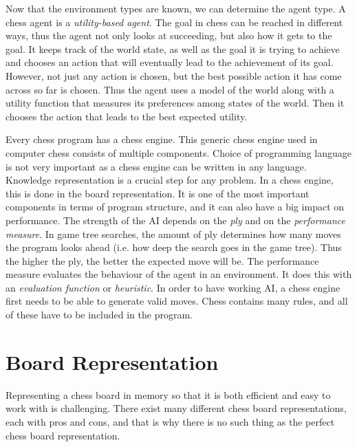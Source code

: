 \documentclass[11pt,letterpaper,twocolumn]{article}
\begin{document}
Now that the environment types are known, we can determine the agent type. A chess agent is a \emph{utility-based agent}. The goal in chess can be reached in different ways,
thus the agent not only looks at succeeding, but also how it gets to the goal. It keeps track of the world state, as well as the goal it is trying to achieve and chooses
an action that will eventually lead to the achievement of its goal. However, not just any action is chosen, but the best possible action it has come across so far is chosen.
Thus the agent uses a model of the world along with a utility function that measures its preferences among states of the world. Then it chooses the action that leads to
the best expected utility.

Every chess program has a chess engine. This generic chess engine used in computer chess consists of multiple components. Choice of programming language is not very important as a chess engine can be written in
any language. Knowledge representation is a crucial step for any problem. In a chess engine, this is done in the board representation. It is one of the most important components in terms of program structure,
and it can also have a big impact on performance. The strength of the AI depends on the \emph{ply} and on the \emph{performance measure}. In game tree searches,
the amount of ply determines how many moves the program looks ahead (i.e. how deep the search goes in the game tree). Thus the higher the ply, the better the expected move
will be. The performance measure evaluates the behaviour of the agent in an environment. It does this with an \emph{evaluation function} or \emph{heuristic}.
In order to have working AI, a chess engine first needs to be able to generate valid moves. Chess contains many rules, and all of these have to be included in the program.

\section{Board Representation}
Representing a chess board in memory so that it is both efficient and easy to work with is challenging. There exist many different chess board representations, each
with pros and cons, and that is why there is no such thing as the perfect chess board representation.
\end{document}
